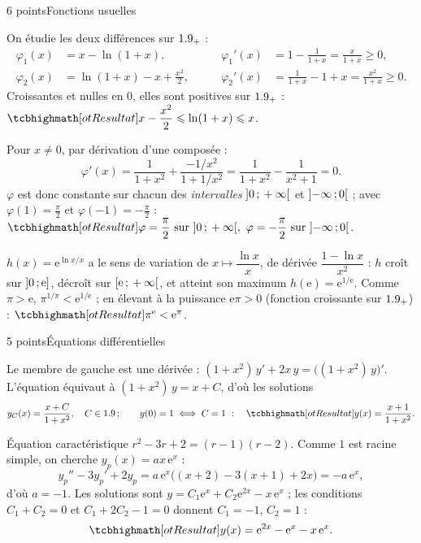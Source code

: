 

\begin{corrigeEval}{6 points}{Fonctions usuelles}
\begin{questions}
  \item On étudie les deux différences sur $1.9_{+}$ :
    \[\begin{aligned}
      \varphi_1(x)&=x-\ln(1+x), &\qquad \varphi_1'(x)&=1-\frac{1}{1+x}=\frac{x}{1+x}\geqslant0,\\
      \varphi_2(x)&=\ln(1+x)-x+\frac{x^{2}}{2}, &\qquad \varphi_2'(x)&=\frac{1}{1+x}-1+x=\frac{x^{2}}{1+x}\geqslant0.
    \end{aligned}\]
    Croissantes et nulles en $0$, elles sont positives sur $1.9_{+}$ :
    $\res{x-\dfrac{x^{2}}{2}\leqslant\ln(1+x)\leqslant x}$. 
  \item Pour $x\neq0$, par dérivation d'une composée :
    \[\varphi'(x)=\frac{1}{1+x^{2}}+\frac{-1/x^{2}}{1+1/x^{2}}
      =\frac{1}{1+x^{2}}-\frac{1}{x^{2}+1}=0.\]
    $\varphi$ est donc constante sur chacun des \emph{intervalles}
    $\mathopen{]}0\,{;}\,+\infty\mathclose{[}$ et $\mathopen{]}-\infty\,{;}\,0\mathclose{[}$ ; avec
    $\varphi(1)=\frac\pi2$ et $\varphi(-1)=-\frac\pi2$ :
    $\res{\varphi=\dfrac\pi2\text{ sur }\intOO{0}{+\infty},\
      \varphi=-\dfrac\pi2\text{ sur }\intOO{-\infty}{0}}$. 
  \item $h(x)=\mathrm{e}^{\ln x/x}$ a le sens de variation de
    $x\mapsto\dfrac{\ln x}{x}$, de dérivée $\dfrac{1-\ln x}{x^{2}}$ : $h$
    croît sur $\mathopen{]}0\,{;}\,\mathrm{e}\mathclose{]}$, décroît sur
    $\mathopen{[}\mathrm{e}\,{;}\,+\infty\mathclose{[}$, et atteint son maximum
    $h(\mathrm{e})=\mathrm{e}^{1/\mathrm{e}}$. Comme $\pi>\mathrm{e}$,
    $\pi^{1/\pi}<\mathrm{e}^{1/\mathrm{e}}$ ; en élevant à la puissance
    $\mathrm{e}\pi>0$ (fonction croissante sur $1.9_{+}$) :
    $\res{\pi^{\mathrm{e}}<\mathrm{e}^{\pi}}$. 
\end{questions}
\end{corrigeEval}

\begin{corrigeEval}{5 points}{Équations différentielles}
\begin{questions}
  \item Le membre de gauche est une dérivée :
    $(1+x^{2})\,y'+2x\,y=\bigl((1+x^{2})\,y\bigr)'$. L'équation équivaut à
    $(1+x^{2})\,y=x+C$, d'où les solutions
    \[y_C(x)=\frac{x+C}{1+x^{2}},\quad C\in\R\,;\qquad y(0)=1\iff C=1\ :\quad
      \res{y(x)=\frac{x+1}{1+x^{2}}}.\]
  \item Équation caractéristique $r^{2}-3r+2=(r-1)(r-2)$. Comme $1$ est
    racine simple, on cherche $y_p(x)=ax\,\mathrm{e}^{x}$ :
    \[y_p''-3y_p'+2y_p=a\,\mathrm{e}^{x}\bigl((x+2)-3(x+1)+2x\bigr)=-a\,\mathrm{e}^{x},\]
    d'où $a=-1$. Les solutions sont
    $y=C_1\mathrm{e}^{x}+C_2\mathrm{e}^{2x}-x\,\mathrm{e}^{x}$ ; les
    conditions $C_1+C_2=0$ et $C_1+2C_2-1=0$ donnent $C_1=-1$, $C_2=1$ :
    \[\res{y(x)=\mathrm{e}^{2x}-\mathrm{e}^{x}-x\,\mathrm{e}^{x}}.\]
    \pts{3 pts}
\end{questions}
\end{corrigeEval}

